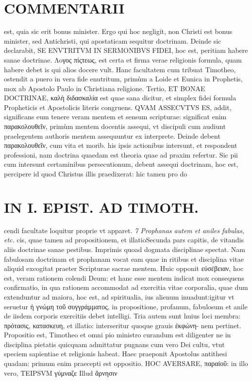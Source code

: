 \documentclass{article}
\begin{document}
\begin{pages}
\section*{COMMENTARII }
\marginpar{[ p.94 ]}\pstart est, quia sic erit bonus minister. Ergo qui hoc negligit, non Christi est bonus minister, sed Antichristi, qui apostaticam sequitur doctrinam. Deinde sic declarabit, SE ENVTRITVM IN SERMONIBVS FIDEI, hoc est, peritiam habere sanae doctrinae. Λoγος πίςτεως, est certa et firma verae religionis formula, quam habere debet is qui alios docere vult. Hanc facultatem cum tribuat Timotheo, ostendit a puero in vera fide enutritum, primùm a Loide et Eunica in Prophetis, mox ab Apostolo Paulo in Christiana religione.  \pend\pstart Tertio, ET BONAE DOCTRINAE, καλὴ διδασκαλία est quae sana dicitur, et simplex fidei formula Propheticis et Apostolicis literis congruens. QVAM ASSECVTVS ES, addit, significans eum tenere veram mentem et sensum scripturae: significat enim παρακολουθεῖν, primùm mentem docentis assequi, vt discipuli cum audiunt praelegentem authoris mentem assequuntur ex interprete. Deinde debent παρακολουθεῖν, cum vita et morib. his ipsis actionibus intersunt, et respondent professioni, nam doctrina quaedam est theoria quae ad praxim refertur. Sic pii cum intersunt certaminibus persecutionum, debent assequi doctrinam, hoc est, percipere id quod Christus illis praedixerat: hic tamen pro do\pend
\section*{IN I. EPIST. AD TIMOTH. }
\marginpar{[ p.95 ]}\pstart cendi facultate loquitur proprie vt apparet.  \pend
\textit{7 Prophanas autem et aniles fabulas, etc. }\pstart cis, quae tamen ad propositionem, et illatioSecunda pars capitis, de vitandis aliis doctrinae sanae pestibus. Imprimis quoad dogmata disciplinae spectat. Nam fabulosam doctrinam et prophanam vocat eam quae in ritibus et disciplina vitae aliquid excogitat praeter Scripturae sacrae mentem. Huic opponit εὐσέβειαν, hoc est, veram rationem colendi Deum: et hanc esse mentem indicat mox consequens confirmatio, in qua rationem accommodat ad exercitia vitae corporalia, quae dum extenduntur ad maiora, hoc est, ad spiritualia, ius alienum inuadunt:igitur vt seruetur ἡ γνώμη τοῦ συγγράμματος, in propositione, profanum, fabulosum et anile de iisdem corporis exercitiis debet intelligi. Tria autem sunt huius loci membra: πρότασις, κατασκευη, et illatio: interseritur quoque grauis ἐκφώνη- nem pertinet.  \pend\pstart Propositio est, Timotheo et omni pio ministro curandum est diligenter ne in disciplina pietatis quicquam admittatur pugnans cum vero Dei cultu, vtut speciem sapientiae et religionis habeat. Haec praeponit Apostolus antithesi quadam: primum enim praecepti est oppositio. HOC AVERSARE, παραίοῦ: in illo vero, TEIPSVM γύμναζε Illud ἄρνησιν  \pend

\end{pages}
\end{document}
